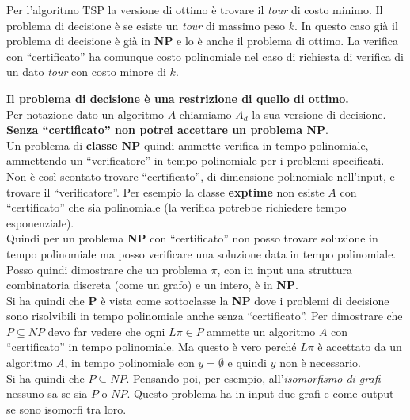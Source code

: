 \begin{esempio}
	Per l'algoritmo TSP la versione di ottimo è trovare il \emph{tour} di costo
	minimo. Il problema di decisione è se esiste un \emph{tour} di massimo peso
	$k$. In questo caso già il problema di decisione è già in \textbf{NP} e lo è
	anche il problema di ottimo. La verifica con ``certificato'' ha comunque costo
	polinomiale nel caso di richiesta di verifica di un dato \emph{tour} con costo
	minore di $k$. 
\end{esempio}
\textbf{Il problema di decisione è una restrizione di quello di ottimo.}\\
Per notazione dato un algoritmo $A$ chiamiamo $A_d$ la sua versione di
decisione.\\

\textbf{Senza ``certificato'' non potrei accettare un problema NP}.\\
Un problema di \textbf{classe NP} quindi ammette verifica in tempo polinomiale,
ammettendo un ``verificatore'' in tempo polinomiale per i problemi
specificati.\\
Non è così scontato trovare ``certificato'', di dimensione polinomiale
nell'input, e trovare il ``verificatore''. Per esempio la classe
\textbf{exptime} non esiste $A$ con ``certificato'' che sia polinomiale (la
verifica potrebbe richiedere tempo esponenziale).\\
Quindi per un problema \textbf{NP} con ``certificato'' non posso trovare
soluzione in tempo polinomiale ma posso verificare una soluzione data in tempo
polinomiale.\\
Posso quindi dimostrare che un problema $\pi$, con in input una struttura
combinatoria discreta (come un grafo) e un intero, è in \textbf{NP}.\\
Si ha quindi che \textbf{P} è vista come sottoclasse la \textbf{NP} dove i
problemi di decisione sono risolvibili in tempo polinomiale anche senza
``certificato''. Per dimostrare che $P\subseteq NP$ devo far vedere che ogni
$L\pi\in P$ ammette un algoritmo $A$ con ``certificato'' in tempo
polinomiale. Ma questo è vero perché $L\pi$ è accettato da un algoritmo $A$, in
tempo polinomiale con $y=\emptyset$ e quindi $y$ non è necessario.\\
Si ha quindi che $P\subseteq NP$. Pensando poi, per esempio,
all'\textit{isomorfismo di grafi} nessuno sa se sia $P$ o $NP$. Questo
problema ha in input due grafi e come output se sono isomorfi tra loro.
